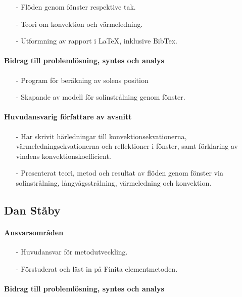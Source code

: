\documentclass[12pt,a4paper]{article}
\begin{document}
\begin{itemize}
\item[-] Flöden genom fönster respektive tak.
\item[-] Teori om konvektion och värmeledning.
\item[-] Utformning av rapport i \LaTeX, inklusive BibTex.
\end{itemize}

\paragraph{Bidrag till problemlösning, syntes och analys}

\begin{itemize}
\item[-] Program för beräkning av solens position
\item[-] Skapande av modell för solinstrålning genom fönster.
\end{itemize}

\paragraph{Huvudansvarig författare av avsnitt}

\begin{itemize}
\item[-] Har skrivit härledningar till konvektionsekvationerna, värmeledningsekvationerna och reflektioner i fönster, samt förklaring av vindens konvektionskoefficient.
\item[-] Presenterat teori, metod och resultat av flöden genom fönster via solinstrålning, långvågsstrålning, värmeledning och konvektion.
\end{itemize}


\subsection*{Dan Ståby}

\paragraph{Ansvarsområden}

\begin{itemize}
\item[-] Huvudansvar för metodutveckling.
\item[-] Förstuderat och läst in på Finita elementmetoden.
\end{itemize}

 \paragraph{Bidrag till problemlösning, syntes och analys}
\end{document}
